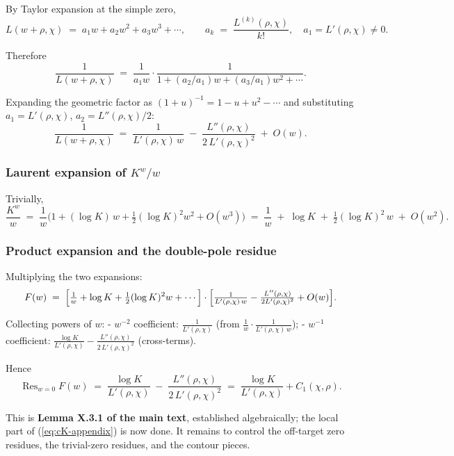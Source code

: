 By Taylor expansion at the simple zero,
\[
L(w + \rho, \chi)
\;=\;
a_1 w + a_2 w^2 + a_3 w^3 + \cdots,
\qquad a_k \;=\; \frac{L^{(k)}(\rho, \chi)}{k!},\quad a_1 = L'(\rho, \chi) \ne 0.
\]

Therefore
\[
\frac{1}{L(w + \rho, \chi)}
\;=\;
\frac{1}{a_1 w} \cdot \frac{1}{1 + (a_2/a_1) w + (a_3/a_1) w^2 + \cdots}.
\]

Expanding the geometric factor as \((1 + u)^{-1} = 1 - u + u^2 - \cdots\)
and substituting \(a_1 = L'(\rho, \chi)\), \(a_2 = L''(\rho, \chi)/2\):
\begin{equation}
\label{eq:invL-Laurent}
\frac{1}{L(w + \rho, \chi)}
\;=\;
\frac{1}{L'(\rho, \chi)\,w}
\;-\;
\frac{L''(\rho, \chi)}{2\,L'(\rho, \chi)^2}
\;+\;
O(w).
\end{equation}

\subsubsection{Laurent expansion of \(K^w / w\)}

Trivially,
\[
\frac{K^w}{w}
\;=\;
\frac{1}{w}\bigl(1 + (\log K)\,w + \tfrac{1}{2}(\log K)^2 w^2 + O(w^3)\bigr)
\;=\;
\frac{1}{w} \;+\; \log K \;+\; \tfrac{1}{2}(\log K)^2 \,w \;+\; O(w^2).
\]

\subsubsection{Product expansion and the double-pole residue}

Multiplying the two expansions:
\[
F(w)
\;=\;
\Bigl[\tfrac{1}{w} + \log K + \tfrac{1}{2}(\log K)^2 w + \cdots\Bigr]
\cdot
\Bigl[\tfrac{1}{L'(\rho,\chi)\,w} - \tfrac{L''(\rho,\chi)}{2 L'(\rho,\chi)^2} + O(w)\Bigr].
\]

Collecting powers of \(w\):
- \(w^{-2}\) coefficient: \(\tfrac{1}{L'(\rho,\chi)}\) (from \(\tfrac{1}{w} \cdot \tfrac{1}{L'(\rho,\chi)\,w}\));
- \(w^{-1}\) coefficient: \(\tfrac{\log K}{L'(\rho,\chi)} - \tfrac{L''(\rho,\chi)}{2\,L'(\rho,\chi)^2}\) (cross-terms).

Hence
\begin{equation}
\label{eq:double-pole-residue}
\mathop{\mathrm{Res}}_{w = 0} F(w)
\;=\;
\frac{\log K}{L'(\rho,\chi)}
\;-\;
\frac{L''(\rho, \chi)}{2\,L'(\rho, \chi)^2}
\;=\;
\frac{\log K}{L'(\rho,\chi)} + C_1(\chi, \rho).
\end{equation}

This is \textbf{Lemma X.3.1 of the main text}, established algebraically;
the local part of (\ref{eq:cK-appendix}) is now done. It remains to
control the off-target zero residues, the trivial-zero residues, and
the contour pieces.


